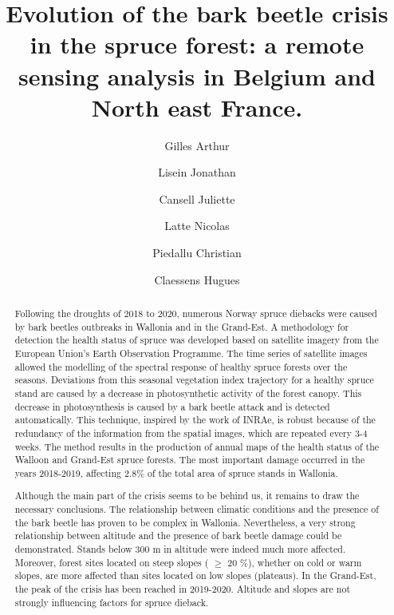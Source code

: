 \documentclass[3p,procedia]{elsarticle}
\begin{document}
\begin{frontmatter}

\author[label1]{Gilles Arthur}
\author[label1]{Lisein Jonathan}
\author[label2]{Cansell Juliette}
\author[label1]{Latte Nicolas}
\author[label3]{Piedallu Christian}
\author[label1]{Claessens Hugues}




\title{Evolution of the bark beetle crisis in the spruce forest: a remote sensing analysis in Belgium and North east France.}
\begin{abstract}
	
\iffalse




Following the droughts of 2018 to 2020, numerous Norway spruce diebacks were caused by bark beetles 
outbreaks in Wallonia and in the Grand-Est. 
A methodology for detection the health status of spruce was developed based on satellite imagery from the European Union's Earth Observation Programme.
The time series of satellite images allowed the modelling of the spectral response of healthy spruce forests over the seasons. Deviations from this seasonal vegetation index trajectory for a healthy spruce stand are caused by a decrease in photosynthetic activity of the forest canopy.
This decrease in photosynthesis is caused by a bark beetle attack and is detected automatically.
This technique, inspired by the work of INRAe, is robust because of the redundancy of the information from the spatial images, which are repeated every 3-4 weeks. 
The method results in the production of annual maps of the health status of the Walloon and Grand-Est spruce forests.
The most important damage occurred in the years 2018-2019, affecting 2.8\% of the total area of spruce stands in Wallonia.

Although the main part of the crisis seems to be behind us, it remains to draw the necessary conclusions.
The relationship between climatic conditions and the presence of the bark beetle has proven to be complex in Wallonia.
Nevertheless, a very strong relationship between altitude and the presence of bark beetle damage could be demonstrated.
Stands below 300 m in altitude were indeed much more affected.
Moreover, forest sites located on steep slopes ( $\ge$  20 \%), whether on cold or warm slopes, are more affected than sites located on low slopes (plateaus).
In the Grand-Est, the peak of the crisis has been reached in 2019-2020. Altitude and slopes are not strongly influencing factors for spruce dieback. 


\end{abstract}
\end{frontmatter}
\end{document}
